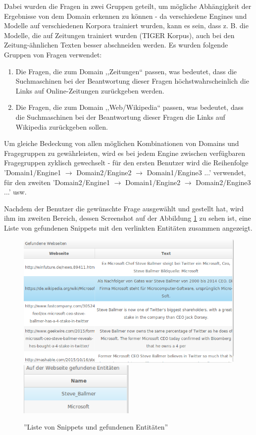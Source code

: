 Dabei wurden die Fragen in zwei Gruppen geteilt, um mögliche Abhängigkeit der Ergebnisse von dem Domain erkennen zu können - da verschiedene Engines und Modelle auf verschiedenen Korpora trainiert wurden, kann es sein, dass z. B. die Modelle, die auf Zeitungen trainiert wurden (TIGER Korpus), auch bei den Zeitung-ähnlichen Texten besser abschneiden werden. Es wurden folgende Gruppen von Fragen verwendet:
\begin{enumerate}
\item Die Fragen, die zum Domain ,,Zeitungen`` passen, was bedeutet, dass die Suchmaschinen bei der Beantwortung dieser Fragen höchstwahrscheinlich die Links auf Online-Zeitungen zurückgeben werden.
\item Die Fragen, die zum Domain ,,Web/Wikipedia`` passen, was bedeutet, dass die Suchmaschinen bei der Beantwortung dieser Fragen die Links auf Wikipedia zurückgeben sollen.
\end{enumerate} 
Um gleiche Bedeckung von allen möglichen Kombinationen von Domains und Fragegruppen zu gewährleisten, wird es bei jedem Engine zwischen verfügbaren Fragegruppen zyklisch gewechselt - für den ersten Benutzer wird die Reihenfolge 'Domain1/Engine1 $\longrightarrow$ Domain2/Engine2 $\longrightarrow$ Domain1/Engine3 ...' verwendet, für den zweiten 'Domain2/Engine1 $\longrightarrow$ Domain1/Engine2 $\longrightarrow$ Domain2/Engine3 ...' usw.

Nachdem der Benutzer die gewünschte Frage ausgewählt und gestellt hat, wird ihm im zweiten Bereich, dessen Screenshot auf der Abbildung \ref{fig:eval-entitylist} zu sehen ist, eine Liste von gefundenen Snippets mit den verlinkten Entitäten zusammen angezeigt.

\begin{figure}
\centering
\includegraphics[width=1\textwidth]{Bilder/evalstep02-step1.png}
\includegraphics[width=0.5\textwidth]{Bilder/evalstep02-step1-2.png}
\caption{''Liste von Snippets und gefundenen Entitäten''}
\label{fig:eval-entitylist}
\end{figure}

